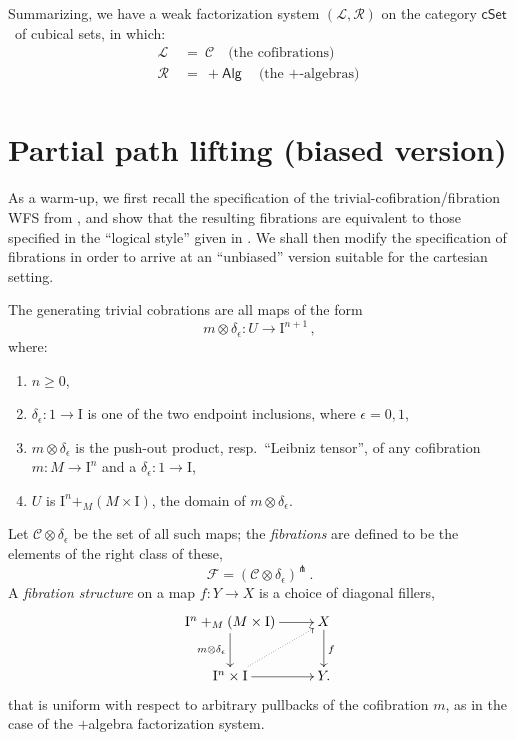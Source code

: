 \documentclass[11pt]{article}
\newcommand{\cSet}{\ensuremath{\mathsf{cSet}}}
\newcommand{\I}{\ensuremath{\mathrm{I}}}
\theoremstyle{remark}
\theoremstyle{definition}
\begin{document}
Summarizing, we have a weak factorization system $(\mathcal{L}, \mathcal{R})$ on the category \cSet\ of cubical sets, in which:
\begin{align*}
\mathcal{L}\ &=\ \mathcal{C}\quad \text{(the cofibrations)}\\
\mathcal{R}\ &=\ +\mathsf{Alg}\quad \text{(the $+$-algebras)}\\
\end{align*}

\section{Partial path lifting (biased version)}

As a warm-up, we first recall the specification of the trivial-cofibration/fibration WFS from \cite{GS}, and show that the resulting fibrations are equivalent to those specified in the ``logical style''  given in \cite{CCHM,OP}.  We shall then modify the specification of fibrations in order to arrive at an ``unbiased'' version suitable for the cartesian setting.

The generating trivial cobrations are all maps of the form
\begin{equation}\label{eq:gentrivcof}
m \otimes \delta_\epsilon : U \to \I^{n+1}\,,
\end{equation}
where:
\begin{enumerate}
\item $n \geq 0$,
\item $\delta_\epsilon : 1 \to \I$ is one of the two endpoint inclusions, where $\epsilon = 0,1$,
\item $m\otimes\delta_\epsilon$ is the push-out product, resp.\ ``Leibniz tensor'', of any cofibration $m : M\to \I^n$ and a $\delta_\epsilon:1 \to \I$,
\item $U$ is  $\I^n +_M (M\times\I)$, the domain of $m \otimes \delta_\epsilon$.
\end{enumerate}

Let $\mathcal{C}\otimes \delta_\epsilon$ be the set of all such maps; the \emph{fibrations} are defined to be the elements of the right class of these,
\[
\mathcal{F} = (\mathcal{C}\otimes \delta_\epsilon)^\pitchfork\,.
\]
A \emph{fibration structure} on a map $f:Y\to X$ is a choice of diagonal fillers,
\begin{equation}\label{diagram:directedfillers}
\xymatrix{
\I^n +_M (M\times\I) \ar[d]_{m \otimes \delta_\epsilon} \ar[r] & X \ar[d]^f \\
\I^{n}\times \I \ar@{.>}[ru] \ar[r] & Y.
}
\end{equation}
that is uniform with respect to arbitrary pullbacks of the cofibration $m$, as in the case of the $+$algebra factorization system.
\end{document}
